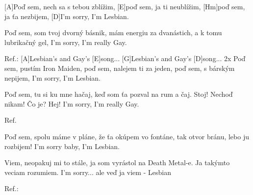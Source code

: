 
[A]Poď sem, nech sa s tebou zblížim,
[E]poď sem, ja ti neublížim,
[Hm]poď sem, ja ťa nezbijem,
[D]I'm sorry, I'm Lesbian.

Poď sem, som tvoj dvorný básnik,
mám energiu za dvanástich,
a k tomu lubrikačný gel,
I'm sorry, I'm really Gay.

Ref.:
[A]Lesbian's and Gay's [E]song... 
[G]Lesbian's and Gay's [D]song... 2x
\slpc
Poď sem, pustím Iron Maiden,
poď sem, nalejem ti za jeden,
poď sem, s bárským nepijem,
I'm sorry, I'm Lesbian.

Poď sem, tu si ku mne hačaj,
keď som ťa pozval na rum a čaj.
Stoj! Nechoď nikam! Čo je? Hej!
I'm sorry, I'm really Gay.

Ref.

Poď sem, spolu máme v pláne,
že ťa okúpem vo fontáne,
tak otvor bránu, lebo ju rozbijem!
I'm sorry baby, I'm Lesbian.

Viem, neopakuj mi to stále,
ja som vyrástol na Death Metal-e.
Ja takýmto veciam rozumiem.
I'm sorry... ale veď ja viem - Lesbian

Ref.:
